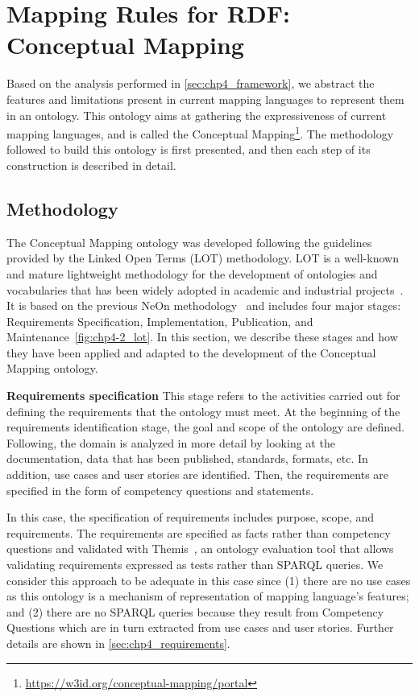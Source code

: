 \section{Mapping Rules for RDF: Conceptual Mapping}
\label{sec:chp4_cm_ontology}

Based on the analysis performed in \cref{sec:chp4_framework}, we abstract the features and limitations present in current mapping languages to represent them in an ontology. This ontology aims at gathering the expressiveness of current mapping languages, and is called the Conceptual Mapping\footnote{\label{foot:cmportal}\url{https://w3id.org/conceptual-mapping/portal}}. The methodology followed to build this ontology is first presented, and then each step of its construction is described in detail.

\subsection{Methodology}
The Conceptual Mapping ontology was developed following the guidelines provided by the Linked Open Terms (LOT) methodology. LOT is a well-known and mature lightweight methodology for the development of ontologies and vocabularies that has been widely adopted in academic and industrial projects~\citep{poveda2022lot}. It is based on the previous NeOn methodology~\citep{suarez2015neon} and includes four major stages: Requirements Specification, Implementation, Publication, and Maintenance~\cref{fig:chp4-2_lot}. In this section, we describe these stages and how they have been applied and adapted to the development of the Conceptual Mapping ontology.

\noindent\textbf{Requirements specification}
This stage refers to the activities carried out for defining the requirements that the ontology must meet. At the beginning of the requirements identification stage, the goal and scope of the ontology are defined. Following, the domain is analyzed in more detail by looking at the documentation, data that has been published, standards, formats, etc. In addition, use cases and user stories are identified. Then, the requirements are specified in the form of competency questions and statements. 

In this case, the specification of requirements includes purpose, scope, and requirements. The requirements are specified as facts rather than competency questions and validated with Themis~\citep{fernandez2021themis}, an ontology evaluation tool that allows validating requirements expressed as tests rather than SPARQL queries. We consider this approach to be adequate in this case since (1) there are no use cases as this ontology is a mechanism of representation of  mapping language's features; and (2) there are no SPARQL queries because they result from Competency Questions which are in turn extracted from use cases and user stories. Further details are shown in \cref{sec:chp4_requirements}.

